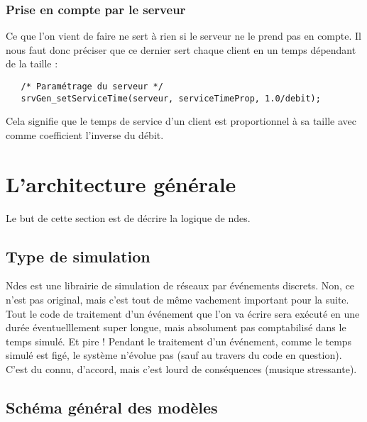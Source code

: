 \documentclass{article}
\begin{document}
\subsubsection{Prise en compte par le serveur}

   Ce que l'on vient de faire ne sert à rien si le serveur ne le prend
pas en compte. Il nous faut donc préciser que ce dernier sert chaque
client en un temps dépendant de la taille :

\begin{verbatim}
   /* Paramétrage du serveur */
   srvGen_setServiceTime(serveur, serviceTimeProp, 1.0/debit);
\end{verbatim}

   Cela signifie que le temps de service d'un client est proportionnel
à sa taille avec comme coefficient l'inverse du débit.

%
\section{L'architecture générale}
\label{section:architecture}

   Le but de cette section est de décrire la logique de {\sc
ndes}.

%
\subsection{Type de simulation}

   {\sc Ndes} est une librairie de simulation de réseaux par événements
discrets. Non, ce n'est pas original, mais c'est tout de même
vachement important pour la suite. Tout le code de traitement d'un
événement que l'on va écrire sera exécuté en une durée éventuelllement
super longue, mais absolument pas comptabilisé dans le temps
simulé. Et pire ! Pendant le traitement d'un événement, comme le temps
simulé est figé, le système n'évolue pas (sauf au travers du code en
question). C'est du connu, d'accord, mais c'est lourd de conséquences
(musique stressante).

%
\subsection{Schéma général des modèles}
\end{document}
